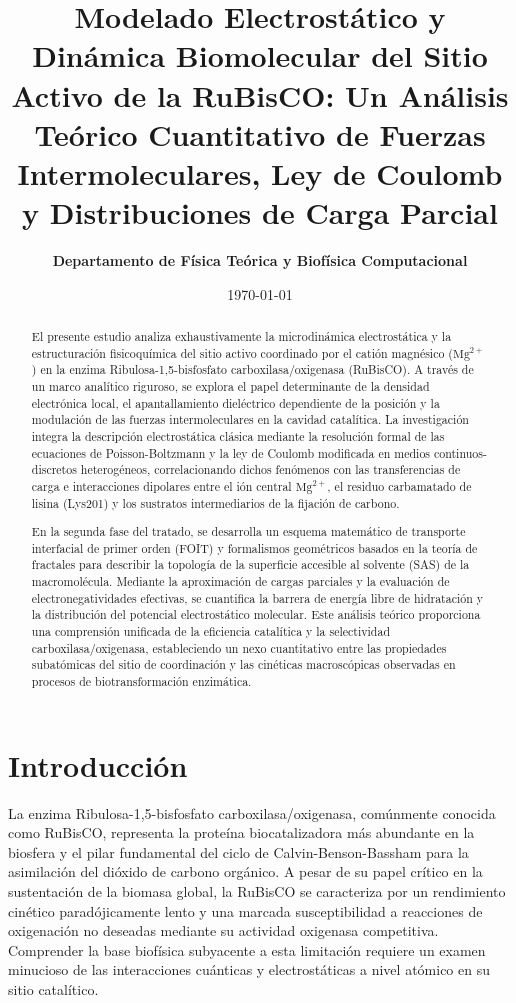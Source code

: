 \documentclass[12pt]{article}
\title{\Large \textbf{Modelado Electrostático y Dinámica Biomolecular del Sitio Activo de la RuBisCO: Un Análisis Teórico Cuantitativo de Fuerzas Intermoleculares, Ley de Coulomb y Distribuciones de Carga Parcial}}
\author{\textbf{Departamento de Física Teórica y Biofísica Computacional}}
\date{\today}
\begin{document}
\maketitle

\begin{abstract}
El presente estudio analiza exhaustivamente la microdinámica electrostática y la estructuración fisicoquímica del sitio activo coordinado por el catión magnésico ($\text{Mg}^{2+}$) en la enzima Ribulosa-1,5-bisfosfato carboxilasa/oxigenasa (RuBisCO). A través de un marco analítico riguroso, se explora el papel determinante de la densidad electrónica local, el apantallamiento dieléctrico dependiente de la posición y la modulación de las fuerzas intermoleculares en la cavidad catalítica. La investigación integra la descripción electrostática clásica mediante la resolución formal de las ecuaciones de Poisson-Boltzmann y la ley de Coulomb modificada en medios continuos-discretos heterogéneos, correlacionando dichos fenómenos con las transferencias de carga e interacciones dipolares entre el ión central $\text{Mg}^{2+}$, el residuo carbamatado de lisina (Lys201) y los sustratos intermediarios de la fijación de carbono.

En la segunda fase del tratado, se desarrolla un esquema matemático de transporte interfacial de primer orden (FOIT) y formalismos geométricos basados en la teoría de fractales para describir la topología de la superficie accesible al solvente (SAS) de la macromolécula. Mediante la aproximación de cargas parciales y la evaluación de electronegatividades efectivas, se cuantifica la barrera de energía libre de hidratación y la distribución del potencial electrostático molecular. Este análisis teórico proporciona una comprensión unificada de la eficiencia catalítica y la selectividad carboxilasa/oxigenasa, estableciendo un nexo cuantitativo entre las propiedades subatómicas del sitio de coordinación y las cinéticas macroscópicas observadas en procesos de biotransformación enzimática.
\end{abstract}

\section{Introducción}

La enzima Ribulosa-1,5-bisfosfato carboxilasa/oxigenasa, comúnmente conocida como RuBisCO, representa la proteína biocatalizadora más abundante en la biosfera y el pilar fundamental del ciclo de Calvin-Benson-Bassham para la asimilación del dióxido de carbono orgánico. A pesar de su papel crítico en la sustentación de la biomasa global, la RuBisCO se caracteriza por un rendimiento cinético paradójicamente lento y una marcada susceptibilidad a reacciones de oxigenación no deseadas mediante su actividad oxigenasa competitiva. Comprender la base biofísica subyacente a esta limitación requiere un examen minucioso de las interacciones cuánticas y electrostáticas a nivel atómico en su sitio catalítico.
\end{document}
